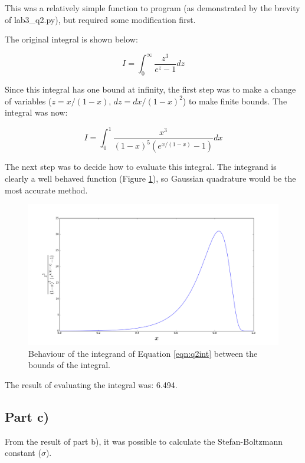 \documentclass[a4paper,12pt]{article}
\begin{document}
This was a relatively simple function to program (as demonstrated by the brevity of lab3\_q2.py), but required some modification first. 

The original integral is shown below:

\begin{equation}
I = \int_0^{\infty}\frac{z^3}{e^z - 1}dz\nonumber
\end{equation}

Since this integral has one bound at infinity, the first step was to make a change of variables ($z = x/(1-x),\, dz = dx/(1-x)^2$) to make finite bounds. The integral was now:

\begin{equation}
I = \int_0^1\frac{x^3}{(1-x)^5 (e^{x/(1-x)}-1)}dx
\label{eqn:q2int}
\end{equation}

The next step was to decide how to evaluate this integral. The integrand is clearly a well behaved function (Figure \ref{fig:q2meta}), so Gaussian quadrature would be the most accurate method. 

\begin{figure}[H]
\centering
\includegraphics[width = \linewidth]{lab3q2meta.png}
\caption{Behaviour of the integrand of Equation \ref{eqn:q2int} between the bounds of the integral.}
\label{fig:q2meta}
\end{figure}

The result of evaluating the integral was: 6.494.

\subsection{Part c)}

From the result of part b), it was possible to calculate the Stefan-Boltzmann constant ($\sigma$).
\end{document}
